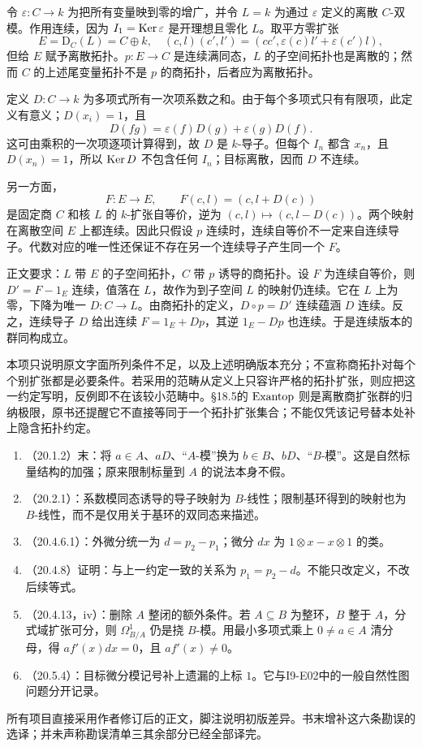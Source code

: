 令 $\varepsilon:C\to k$ 为把所有变量映到零的增广，并令 $L=k$ 为通过 $\varepsilon$ 定义的离散 $C$-双模。作用连续，因为 $I_1=\operatorname{Ker}\varepsilon$ 是开理想且零化 $L$。取平方零扩张
\[
 E=\mathrm D_C(L)=C\oplus k,
 \quad(c,l)(c',l')=(cc',\varepsilon(c)l'+\varepsilon(c')l),
\]
但给 $E$ 赋予离散拓扑。$p:E\to C$ 是连续满同态，$L$ 的子空间拓扑也是离散的；然而 $C$ 的上述尾变量拓扑不是 $p$ 的商拓扑，后者应为离散拓扑。

定义 $D:C\to k$ 为多项式所有一次项系数之和。由于每个多项式只有有限项，此定义有意义；$D(x_i)=1$，且
\[
 D(fg)=\varepsilon(f)D(g)+\varepsilon(g)D(f).
\]
这可由乘积的一次项逐项计算得到，故 $D$ 是 $k$-导子。但每个 $I_n$ 都含 $x_n$，且 $D(x_n)=1$，所以 $\operatorname{Ker} D$ 不包含任何 $I_n$；目标离散，因而 $D$ 不连续。

另一方面，
\[
 F:E\longrightarrow E,\qquad F(c,l)=(c,l+D(c))
\]
是固定商 $C$ 和核 $L$ 的 $k$-扩张自等价，逆为 $(c,l)\mapsto(c,l-D(c))$。两个映射在离散空间 $E$ 上都连续。因此只假设 $p$ 连续时，连续自等价不一定来自连续导子。代数对应的唯一性还保证不存在另一个连续导子产生同一个 $F$。

正文要求：$L$ 带 $E$ 的子空间拓扑，$C$ 带 $p$ 诱导的商拓扑。设 $F$ 为连续自等价，则 $D'=F-1_E$ 连续，值落在 $L$，故作为到子空间 $L$ 的映射仍连续。它在 $L$ 上为零，下降为唯一 $D:C\to L$。由商拓扑的定义，$D\circ p=D'$ 连续蕴涵 $D$ 连续。反之，连续导子 $D$ 给出连续 $F=1_E+D p$，其逆 $1_E-Dp$ 也连续。于是连续版本的群同构成立。

本项只说明原文字面所列条件不足，以及上述明确版本充分；不宣称商拓扑对每个个别扩张都是必要条件。若采用的范畴从定义上只容许严格的拓扑扩张，则应把这一约定写明，反例即不在该较小范畴中。§18.5的 $\operatorname{Exantop}$ 则是离散商扩张群的归纳极限，原书还提醒它不直接等同于一个拓扑扩张集合；不能仅凭该记号替本处补上隐含拓扑约定。

\begin{enumerate}[label=\arabic*)]
\item （20.1.2）末：将 $a\in A$、$aD$、“$A$-模”换为 $b\in B$、$bD$、“$B$-模”。这是自然标量结构的加强；原来限制标量到 $A$ 的说法本身不假。
\item （20.2.1）：系数模同态诱导的导子映射为 $B$-线性；限制基环得到的映射也为 $B$-线性，而不是仅用关于基环的双同态来描述。
\item （20.4.6.1）：外微分统一为 $d=p_2-p_1$；微分 $dx$ 为 $1\otimes x-x\otimes1$ 的类。
\item （20.4.8）证明：与上一约定一致的关系为 $p_1=p_2-d$。不能只改定义，不改后续等式。
\item （20.4.13，iv）：删除 $A$ 整闭的额外条件。若 $A\subseteq B$ 为整环，$B$ 整于 $A$，分式域扩张可分，则 $\Omega^1_{B/A}$ 仍是挠 $B$-模。用最小多项式乘上 $0\ne a\in A$ 清分母，得 $af'(x)dx=0$，且 $af'(x)\ne0$。
\item （20.5.4）：目标微分模记号补上遗漏的上标 $1$。它与I9-E02中的一般自然性图问题分开记录。
\end{enumerate}
所有项目直接采用作者修订后的正文，脚注说明初版差异。书末增补这六条勘误的选译；并未声称勘误清单三其余部分已经全部译完。

